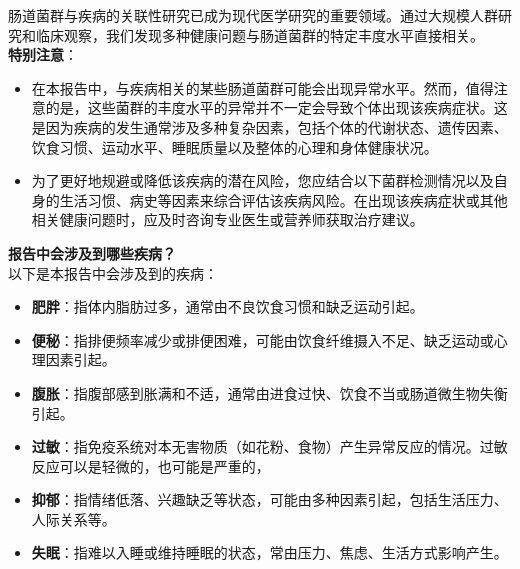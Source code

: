 \documentclass[UTF8]{ctexart}
\begin{document}
\begin{tcolorbox}[
    enhanced,
    colback=customTealBg,
    colframe=customTealBg,
    arc=3mm,
    boxrule=0pt,
    width=\textwidth,
    top=8pt,
    bottom=8pt
]
{\small{\color{customTeal}\faInfoCircle} 肠道菌群与疾病的关联性研究已成为现代医学研究的重要领域。通过大规模人群研究和临床观察，我们发现多种健康问题与肠道菌群的特定丰度水平直接相关。\\

{\color{orange}\faExclamationTriangle} \textbf{特别注意}：
\begin{itemize}
    \item 在本报告中，与疾病相关的某些肠道菌群可能会出现异常水平。然而，值得注意的是，这些菌群的丰度水平的异常并不一定会导致个体出现该疾病症状。这是因为疾病的发生通常涉及多种复杂因素，包括个体的代谢状态、遗传因素、饮食习惯、运动水平、睡眠质量以及整体的心理和身体健康状况。 \item 为了更好地规避或降低该疾病的潜在风险，您应结合以下菌群检测情况以及自身的生活习惯、病史等因素来综合评估该疾病风险。在出现该疾病症状或其他相关健康问题时，应及时咨询专业医生或营养师获取治疗建议。
\end{itemize}
}
\end{tcolorbox}

\begin{tcolorbox}[
    enhanced,
    colback=lightpurple!10, %
    colframe=lightpurple!10,  %
    arc=3mm,
    boxrule=0.5pt,
    width=\textwidth,
    top=8pt,
    bottom=8pt
]
{\small{\color{lightpurple}\faQuestionCircle}\quad \textbf{报告中会涉及到哪些疾病？}\\
{\color{orange!50}\faComments}\quad 以下是本报告中会涉及到的疾病：
\begin{itemize}
    \item \textbf{肥胖}：指体内脂肪过多，通常由不良饮食习惯和缺乏运动引起。
    \item \textbf{便秘}：指排便频率减少或排便困难，可能由饮食纤维摄入不足、缺乏运动或心理因素引起。
    \item \textbf{腹胀}：指腹部感到胀满和不适，通常由进食过快、饮食不当或肠道微生物失衡引起。
    \item \textbf{过敏}：指免疫系统对本无害物质（如花粉、食物）产生异常反应的情况。过敏反应可以是轻微的，也可能是严重的，
    \item \textbf{抑郁}：指情绪低落、兴趣缺乏等状态，可能由多种因素引起，包括生活压力、人际关系等。
    \item \textbf{失眠}：指难以入睡或维持睡眠的状态，常由压力、焦虑、生活方式影响产生。
\end{itemize}
}
\end{tcolorbox}
\end{document}
